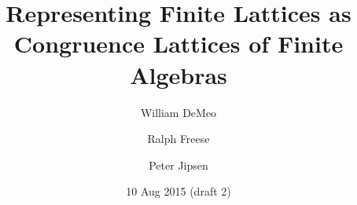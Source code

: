   \newcommand{\todo}[1]{\ifthenelse{\boolean{todos}}{%
       \vskip2mm{\bf TODO:} #1\vskip2mm}{}}






\title[Representing Finite Lattices]{Representing Finite Lattices as \\Congruence
  Lattices of Finite Algebras} 


\author[W. DeMeo]{William DeMeo}
\address{Department of Mathematics\\Iowa State University\\Ames 50010\\USA}
\author[R. Freese]{Ralph Freese}
\address{Department of Mathematics\\University of Hawaii\\Honolulu 96822\\USA}
\author[P. Jipsen]{Peter Jipsen}
\address{School of Computational Sciences\\Chapman University\\Orange 92866\\USA}


\date{10 Aug 2015 (draft 2)}

